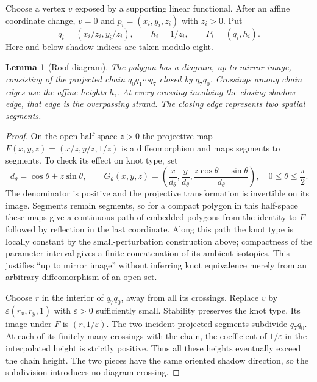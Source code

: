 \documentclass[11pt]{article}
\newtheorem{lemma}[theorem]{Lemma}
\begin{document}
Choose a vertex $v$ exposed by a supporting linear functional. After an
affine coordinate change, $v=0$ and
$p_i=(x_i,y_i,z_i)$ with $z_i>0$. Put
\[
 q_i=(x_i/z_i,y_i/z_i),\qquad h_i=1/z_i,\qquad P_i=(q_i,h_i).
\]
Here and below shadow indices are taken modulo eight.

\begin{lemma}[Roof diagram]\label{lem:roof}
The polygon has a diagram, up to mirror image, consisting of the projected
chain $q_0q_1\cdots q_7$ closed by $q_7q_0$. Crossings among chain edges
use the affine heights $h_i$. At every crossing involving the closing
shadow edge, that edge is the overpassing strand. The closing edge
represents two spatial segments.
\end{lemma}
\begin{proof}
On the open half-space $z>0$ the projective map
$F(x,y,z)=(x/z,y/z,1/z)$ is a diffeomorphism and maps segments to segments.
To check its effect on knot type, set
\[
 d_\theta=\cos\theta+z\sin\theta,\qquad
 G_\theta(x,y,z)=\left(\frac{x}{d_\theta},\frac{y}{d_\theta},
 \frac{z\cos\theta-\sin\theta}{d_\theta}\right),
 \quad 0\leq\theta\leq\frac\pi2.
\]
The denominator is positive and the projective transformation is
invertible on its image. Segments remain segments, so for a compact
polygon in this half-space these maps give a continuous path of embedded
polygons from the identity to $F$ followed by reflection in the last
coordinate. Along this path the knot type is locally constant by the
small-perturbation construction above; compactness of the parameter
interval gives a finite concatenation of its ambient isotopies.
This justifies ``up to mirror image'' without inferring knot equivalence
merely from an arbitrary diffeomorphism of an open set.

Choose $r$ in the interior of $q_7q_0$, away from all its crossings.
Replace $v$ by $\varepsilon(r_x,r_y,1)$ with $\varepsilon>0$ sufficiently
small. Stability preserves the knot type. Its image under $F$ is
$(r,1/\varepsilon)$. The two incident projected segments subdivide
$q_7q_0$. At each of its finitely many crossings with the chain, the
coefficient of $1/\varepsilon$ in the interpolated height is strictly
positive. Thus all these heights eventually exceed the chain height.
The two pieces have the same oriented shadow direction, so the
subdivision introduces no diagram crossing.
\end{proof}
\end{document}
